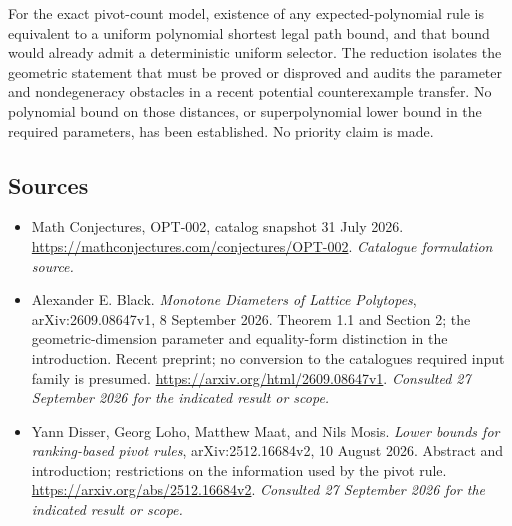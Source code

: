 \documentclass[11pt,a4paper]{article}
\numberwithin{equation}{section}
\begin{document}
For the exact pivot-count model, existence of any expected-polynomial
rule is equivalent to a uniform polynomial shortest legal path bound,
and that bound would already admit a deterministic uniform selector.
The reduction isolates the geometric statement that must be proved or
disproved and audits the parameter and nondegeneracy obstacles in a
recent potential counterexample transfer.  No polynomial bound on
those distances, or superpolynomial lower bound in the required
parameters, has been established.  No priority claim is made.
\subsection{Sources}
\begin{itemize}\raggedright
\item[\textnormal{[S1]}]\hypertarget{source:131:1}{} Math Conjectures, OPT-002, catalog snapshot 31 July 2026.
\url{https://mathconjectures.com/conjectures/OPT-002}.
{\small\textit{Catalogue formulation source.}}
\item[\textnormal{[E1]}]\hypertarget{extra:131:1}{} Alexander E. Black.
\emph{Monotone Diameters of Lattice Polytopes}, arXiv:2609.08647v1, 8 September 2026. Theorem 1.1 and Section 2; the geometric-dimension parameter and equality-form distinction in the introduction. Recent preprint; no conversion to the catalogue\textquotesingle s required input family is presumed.
\url{https://arxiv.org/html/2609.08647v1}.
{\small\textit{Consulted 27 September 2026 for the indicated result or scope.}}
\item[\textnormal{[E2]}]\hypertarget{extra:131:2}{} Yann Disser, Georg Loho, Matthew Maat, and Nils Mosis.
\emph{Lower bounds for ranking-based pivot rules}, arXiv:2512.16684v2, 10 August 2026. Abstract and introduction; restrictions on the information used by the pivot rule.
\url{https://arxiv.org/abs/2512.16684v2}.
{\small\textit{Consulted 27 September 2026 for the indicated result or scope.}}
\end{itemize}
\end{document}
